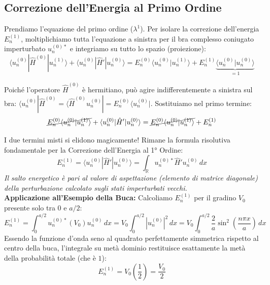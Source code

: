 \documentclass[11pt, a4paper]{article}
\begin{document}
\subsection{Correzione dell'Energia al Primo Ordine} %

Prendiamo l'equazione del primo ordine ($\lambda^1$). Per isolare la correzione dell'energia $E_n^{(1)}$, moltiplichiamo tutta l'equazione a sinistra per il bra complesso coniugato imperturbato $u_n^{(0)*}$ e integriamo su tutto lo spazio (proiezione): %
\begin{equation*}
    \langle u_n^{(0)} | \hat{H}^{(0)} | u_n^{(1)} \rangle + \langle u_n^{(0)} | \hat{H}' | u_n^{(0)} \rangle = E_n^{(0)} \langle u_n^{(0)} | u_n^{(1)} \rangle + E_n^{(1)} \underbrace{ \langle u_n^{(0)} | u_n^{(0)} \rangle }_{=1} %
\end{equation*}

\noindent
Poiché l'operatore $\hat{H}^{(0)}$ è hermitiano, può agire indifferentemente a sinistra sul bra: $\langle u_n^{(0)} | \hat{H}^{(0)} = \langle \hat{H}^{(0)} u_n^{(0)} | = E_n^{(0)} \langle u_n^{(0)} |$. Sostituiamo nel primo termine: %
\begin{equation*}
    \cancel{E_n^{(0)} \langle u_n^{(0)} | u_n^{(1)} \rangle} + \langle u_n^{(0)} | \hat{H}' | u_n^{(0)} \rangle = \cancel{E_n^{(0)} \langle u_n^{(0)} | u_n^{(1)} \rangle} + E_n^{(1)} %
\end{equation*}

\noindent
I due termini misti si elidono magicamente! Rimane la formula risolutiva fondamentale per la Correzione dell'Energia al 1° Ordine: %
\begin{equation}
    \boxed{ E_n^{(1)} = \langle u_n^{(0)} | \hat{H}' | u_n^{(0)} \rangle = \int_{\mathbb{R}} u_n^{(0)*} \hat{H}' u_n^{(0)} \, dx } %
\end{equation}
\textit{Il salto energetico è pari al valore di aspettazione (elemento di matrice diagonale) della perturbazione calcolato sugli stati imperturbati vecchi.} \\

\noindent
\textbf{Applicazione all'Esempio della Buca:} %
Calcoliamo $E_n^{(1)}$ per il gradino $V_0$ presente solo tra $0$ e $a/2$: %
\begin{equation*}
    E_n^{(1)} = \int_0^{a/2} u_n^{(0)*} (V_0) u_n^{(0)} \, dx = V_0 \int_0^{a/2} |u_n^{(0)}|^2 \, dx = V_0 \int_0^{a/2} \frac{2}{a} \sin^2\left(\frac{n\pi x}{a}\right) \, dx %
\end{equation*}
Essendo la funzione d'onda seno al quadrato perfettamente simmetrica rispetto al centro della buca, l'integrale su metà dominio restituisce esattamente la metà della probabilità totale (che è $1$): %
\begin{equation*}
    E_n^{(1)} = V_0 \left( \frac{1}{2} \right) = \frac{V_0}{2} %
\end{equation*}
\end{document}
